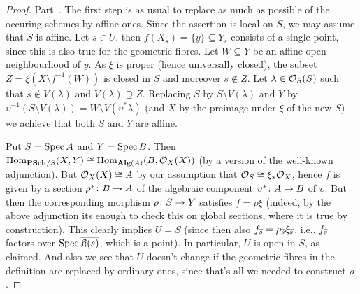 \documentclass[a4paper,parskip=half,numbers=enddot, DIV=12]{scrreprt}
\begin{document}
\begin{proof}
	Part~. The first step is as usual to replace as much as possible of the occuring schemes by affine ones. Since the assertion is local on $S$, we may assume that $S$ is affine.	Let $s\in U$, then $f(X_s)=\{y\}\subseteq Y_s$ consists of a single point, since this is also true for the geometric fibres. Let $W\subseteq Y$ be an affine open neighbourhood of $y$. As $\xi$ is proper (hence universally closed), the subset $Z=\xi(X\setminus f^{-1}(W))$ is closed in $S$ and moreover $s\notin Z$. Let $\lambda\in\mathcal{O}_S(S)$ such that $s\notin V(\lambda)$ and $V(\lambda)\supseteq Z$. Replacing $S$ by $S\setminus V(\lambda)$ and $Y$ by $\upsilon^{-1}(S\setminus V(\lambda))=W\setminus V(\upsilon ^*\lambda)$ (and $X$ by the preimage under $\xi$ of the new $S$) we achieve that both $S$ and $Y$ are affine.
	
	Put $S=\operatorname{Spec} A$ and $Y=\operatorname{Spec} B$. Then $\Hom_{\cat{PSch}/S}(X,Y)\cong \Hom_{\cat{Alg}(A)}(B,\Oo_X(X))$ (by a version of the well-known adjunction). But $\mathcal{O}_X(X)\cong A$ by our assumption that $\mathcal{O}_S\cong \xi_*\mathcal{O}_X$, hence $f$ is given by a section $\rho^*\colon B\morphism A$ of the algebraic component $\upsilon^*\colon A\morphism B$ of $\upsilon$. But then the corresponding morphism $\rho\colon S\morphism Y$ satisfies $f=\rho\xi$ (indeed, by the above adjunction its enough to check this on global sections, where it is true by construction). This clearly implies $U=S$ (since then also $f_{\overline{s}}=\rho_{\overline{s}}\xi_{\overline{s}}$, i.e., $f_{\overline{s}}$ factors over $\operatorname{Spec}\overline{\mathfrak{K}(s)}$, which is a point). In particular, $U$ is open in $S$, as claimed. And also we see that $U$ doesn't change if the geometric fibres in the definition are replaced by ordinary ones, since that's all we needed to construct $\rho$.
	

\end{proof}
\end{document}
